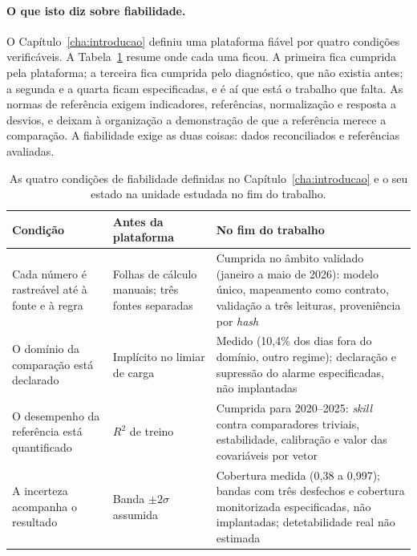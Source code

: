 \paragraph{O que isto diz sobre fiabilidade.} O Capítulo~\ref{cha:introducao}
definiu uma plataforma fiável por quatro condições verificáveis. A
Tabela~\ref{tab:fiabilidade-estado} resume onde cada uma ficou. A primeira
fica cumprida pela plataforma; a terceira fica cumprida pelo diagnóstico, que
não existia antes; a segunda e a quarta ficam especificadas, e é aí que está
o trabalho que falta. As normas de referência exigem indicadores,
referências, normalização e resposta a desvios, e deixam à organização a
demonstração de que a referência merece a comparação. A fiabilidade exige as
duas coisas: dados reconciliados e referências avaliadas.

\begin{table}[htbp]
  \centering\small
  \caption[Condições de fiabilidade: estado no fim do trabalho]{As quatro
  condições de fiabilidade definidas no Capítulo~\ref{cha:introducao} e o seu
  estado na unidade estudada no fim do trabalho.}
  \label{tab:fiabilidade-estado}
  \ntzebra
  \begin{tabularx}{\textwidth}{@{}>{\raggedright\arraybackslash}p{3.3cm}>{\raggedright\arraybackslash}X>{\raggedright\arraybackslash}X@{}}
    \toprule
    \textbf{Condição}  &  \textbf{Antes da plataforma}  &  \textbf{No fim do trabalho} \\
    \midrule
    Cada número é rastreável até à fonte e à regra & Folhas de cálculo manuais; três fontes separadas & Cumprida no âmbito validado (janeiro a maio de 2026): modelo único, mapeamento como contrato, validação a três leituras, proveniência por \emph{hash} \\
    O domínio da comparação está declarado & Implícito no limiar de carga & Medido (10,4\% dos dias fora do domínio, outro regime); declaração e supressão do alarme especificadas, não implantadas \\
    O desempenho da referência está quantificado & $R^2$ de treino & Cumprida para 2020--2025: \emph{skill} contra comparadores triviais, estabilidade, calibração e valor das covariáveis por vetor \\
    A incerteza acompanha o resultado & Banda $\pm2\sigma$ assumida & Cobertura medida (0,38 a 0,997); bandas com três desfechos e cobertura monitorizada especificadas, não implantadas; detetabilidade real não estimada \\
    \bottomrule
  \end{tabularx}
\end{table}

